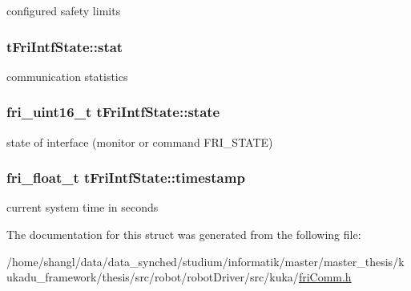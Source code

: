 configured safety limits \hypertarget{structtFriIntfState_ad0a01c6520f016a648836da5ed4beacd}{
\subsubsection[{stat}]{ {\bf t\-Fri\-Intf\-State\-::stat}}}\label{structtFriIntfState_ad0a01c6520f016a648836da5ed4beacd}
communication statistics \hypertarget{structtFriIntfState_a690159bffb5c3290f19e1369fd68b403}{
\subsubsection[{state}]{\setlength{\rightskip}{0pt plus 5cm}fri\-\_\-uint16\-\_\-t {\bf t\-Fri\-Intf\-State\-::state}}}\label{structtFriIntfState_a690159bffb5c3290f19e1369fd68b403}
state of interface (monitor or command \-F\-R\-I\-\_\-\-S\-T\-A\-T\-E) \hypertarget{structtFriIntfState_a327be107aefb5b34ee67706ebae192ff}{
\subsubsection[{timestamp}]{\setlength{\rightskip}{0pt plus 5cm}fri\-\_\-float\-\_\-t {\bf t\-Fri\-Intf\-State\-::timestamp}}}\label{structtFriIntfState_a327be107aefb5b34ee67706ebae192ff}
current system time in seconds 

\-The documentation for this struct was generated from the following file\-:\begin{DoxyCompactItemize}
\item 
/home/shangl/data/data\-\_\-synched/studium/informatik/master/master\-\_\-thesis/kukadu\-\_\-framework/thesis/src/robot/robot\-Driver/src/kuka/\hyperlink{friComm_8h}{fri\-Comm.\-h}\end{DoxyCompactItemize}
